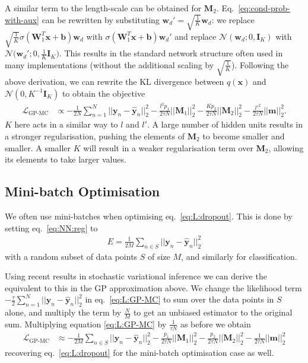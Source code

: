 \documentclass{article} %
\newcommand{\N}{\mathcal{N}}
\newcommand{\cL}{\mathcal{L}}
\newcommand{\x}{\mathbf{x}}
\newcommand{\Bb}{\mathbf{b}}
\newcommand{\y}{\mathbf{y}}
\newcommand{\w}{\mathbf{w}}
\newcommand{\W}{\mathbf{W}}
\newcommand{\m}{\mathbf{m}}
\newcommand{\I}{\mathbf{I}}
\newcommand{\M}{\mathbf{M}}
\theoremstyle{definition}
\begin{document}
A similar term to the length-scale can be obtained for $\M_2$. Eq.\ \eqref{eq:cond-prob-with-aux} can be rewritten by substituting $\w_d' = \sqrt{\frac{1}{K}} \w_d$: we replace $\sqrt{\frac{1}{K}} \sigma(\W_1^T \x + \Bb) \w_d$ with $\sigma(\W_1^T \x + \Bb) \w_d'$ and replace $\N(\w_d; 0, \I_K)$ with $\N \big(\w_d'; 0, \frac{1}{K} \I_K \big)$. This results in the standard network structure often used in many implementations (without the additional scaling by $\sqrt{\frac{1}{K}}$). Following the above derivation, we can rewrite the KL divergence between $q(\x)$ and $\N (0, K^{-1} \I_K)$ to obtain the objective
\begin{align} \label{eq:L:GP-MC-reg-lengthscale}
\cL_{\text{GP-MC}} &\propto  - \frac{1}{2 N} \sum_{n=1}^N || \y_n - \widehat{\y}_n ||^2_2 - \frac{l^2 p_1}{2 \tau N} ||\M_1||^2_2 - \frac{K p_2}{2 \tau N} ||\M_2||^2_2 - \frac{l'^2}{2 \tau N}||\m||^2_2.
\end{align}
$K$ here acts in a similar way to $l$ and $l'$. A large number of hidden units results in a stronger regularisation, pushing the elements of $\M_2$ to become smaller and smaller. A smaller $K$ will result in a weaker regularisation term over $\M_2$, allowing its elements to take larger values.



\subsection{Mini-batch Optimisation}
We often use mini-batches when optimising eq.\ \eqref{eq:L:dropout}. This is done by setting eq.\ \eqref{eq:NN:reg} to
\begin{align*} 
E = \frac{1}{2M}
\sum_{n \in S} ||\y_n - \widehat{\y}_n||^2_2
\end{align*}
with a random subset of data points $S$ of size $M$, and similarly for classification.

Using recent results in stochastic variational inference \citep{hoffman2013stochastic} we can derive the equivalent to this in the GP approximation above. We change the likelihood term $-\frac{\tau}{2} \sum_{n=1}^N || \y_n - \widehat{\y}_n ||^2_2$ in eq.\ \eqref{eq:L:GP-MC} to sum over the data points in $S$ alone, and multiply the term by $\frac{N}{M}$ to get an unbiased estimator to the original sum.
Multiplying equation \eqref{eq:L:GP-MC} by $\frac{1}{\tau N}$ as before we obtain
\begin{align} \label{eq:L:GP-MC-reg-SVI}
\cL_{\text{GP-MC}} &\approx  - \frac{1}{2 M} \sum_{n \in S} || \y_n - \widehat{\y}_n ||^2_2 - \frac{p_1}{2 \tau N} ||\M_1||^2_2 - \frac{p_2}{2 \tau N} ||\M_2||^2_2 - \frac{1}{2 \tau N}||\m||^2_2 
\end{align}
recovering eq.\ \eqref{eq:L:dropout} for the mini-batch optimisation case as well.
\end{document}
